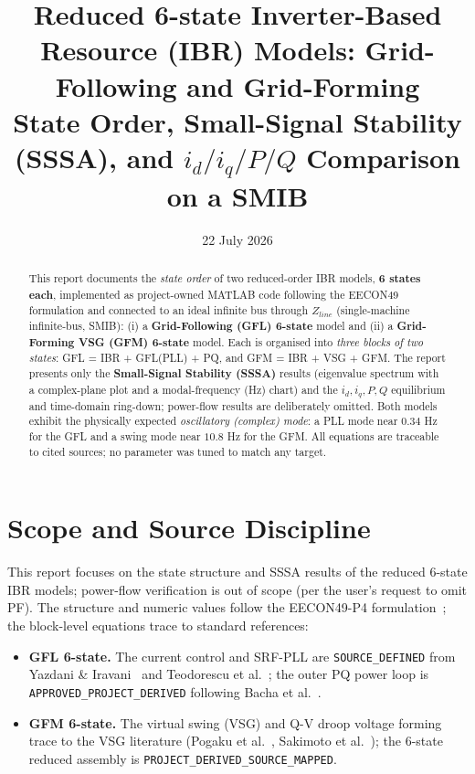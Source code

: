 \documentclass[12pt,a4paper]{article}
\title{\textbf{Reduced 6-state Inverter-Based Resource (IBR) Models: Grid-Following and Grid-Forming}\\
\large State Order, Small-Signal Stability (SSSA), and $i_d/i_q/P/Q$ Comparison on a SMIB}
\date{22 July 2026}
\begin{document}
\maketitle

\begin{abstract}
This report documents the \emph{state order} of two reduced-order IBR models,
\textbf{6 states each}, implemented as project-owned MATLAB code following the
EECON49 formulation and connected to an ideal infinite bus through $Z_{line}$
(single-machine infinite-bus, SMIB): (i) a \textbf{Grid-Following (GFL) 6-state}
model and (ii) a \textbf{Grid-Forming VSG (GFM) 6-state} model. Each is organised
into \emph{three blocks of two states}: GFL = IBR + GFL(PLL) + PQ, and GFM = IBR +
VSG + GFM. The report presents only the \textbf{Small-Signal Stability (SSSA)}
results (eigenvalue spectrum with a complex-plane plot and a modal-frequency (Hz)
chart) and the $i_d,i_q,P,Q$ equilibrium and time-domain ring-down; power-flow
results are deliberately omitted. Both models exhibit the physically expected
\emph{oscillatory (complex) mode}: a PLL mode near $0.34$ Hz for the GFL and a
swing mode near $10.8$ Hz for the GFM. All equations are traceable to cited
sources; no parameter was tuned to match any target.
\end{abstract}
\newpage
\tableofcontents
\newpage

\section{Scope and Source Discipline}

This report focuses on the state structure and SSSA results of the reduced 6-state
IBR models; power-flow verification is out of scope (per the user's request to omit
PF). The structure and numeric values follow the EECON49-P4 formulation~\cite{eecon49};
the block-level equations trace to standard references:

\begin{itemize}
  \item \textbf{GFL 6-state.} The current control and SRF-PLL are
  \texttt{SOURCE\_DEFINED} from Yazdani \& Iravani~\cite{yazdani2010} and
  Teodorescu et al.~\cite{teodorescu2011}; the outer PQ power loop is
  \texttt{APPROVED\_PROJECT\_DERIVED} following Bacha et al.~\cite{bacha2014}.
  \item \textbf{GFM 6-state.} The virtual swing (VSG) and Q-V droop voltage forming
  trace to the VSG literature (Pogaku et al.~\cite{pogaku2007}, Sakimoto et
  al.~\cite{sakimoto2015}); the 6-state reduced assembly is
  \texttt{PROJECT\_DERIVED\_SOURCE\_MAPPED}.
\end{itemize}
\end{document}

